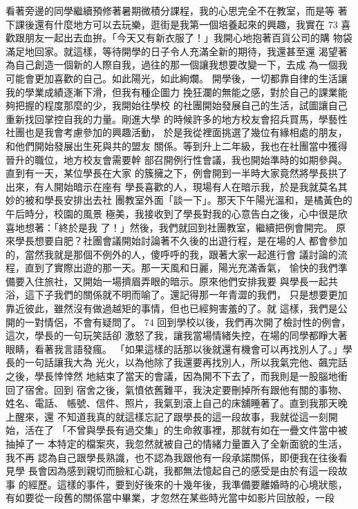看著旁邊的同學繼續預修著暑期微積分課程，我的心思完全不在教室，而是等
著下課後還有什麼地方可以去玩樂，逛街是我第一個培養起來的興趣，我實在
73 
喜歡跟朋友一起出去血拚。「今天又有新衣服了！」我開心地抱著百貨公司的購
物袋滿足地回家。就這樣，等待開學的日子令人充滿全新的期待，我還甚至還
渴望著為自己創造一個新的人際自我，過往的那一個讓我想要改變一下，去成
為一個我可能會更加喜歡的自己。如此陽光，如此絢爛。 
開學後，一切都靠自律的生活讓我的學業成績逐漸下滑，但我有種企圖力
挽狂瀾的無能之感，對於自己的課業能夠把握的程度那麼的少，我開始往學校
的社團開始發展自己的生活，試圖讓自己重新找回掌控自我的力量。剛進大學
的時候許多的地方校友會招兵買馬，學藝性社團也是我會考慮參加的興趣活動，
於是我從裡面挑選了幾位有緣相處的朋友，和他們開始發展出生死與共的盟友
關係。等到升上二年級，我也在社團當中獲得晉升的職位，地方校友會需要幹
部召開例行性會議，我也開始準時的如期參與。直到有一天，某位學長在大家
的簇擁之下，例會開到一半時大家竟然將學長拱了出來，有人開始暗示在座有
學長喜歡的人，現場有人在暗示我，於是我就莫名其妙的被和學長安排出去社
團教室外面「談一下」。那天下午陽光溫和，是橘黃色的午后時分，校園的風景
極美，我接收到了學長對我的心意告白之後，心中很是欣喜地想著：「終於是我
了！」然後，我們就回到社團教室，繼續把例會開完。 
原來學長想要自肥？社團會議開始討論著不久後的出遊行程，是在場的人
都會參加的，當然我就是那個不例外的人，傻呼呼的我，跟著大家一起進行會
議討論的流程，直到了實際出遊的那一天。那一天風和日麗，陽光充滿香氣，
愉快的我們準備要入住旅社，又開始一場擠眉弄眼的暗示。原來他們安排我要
與學長一起共浴，這下子我們的關係就不明而喻了。還記得那一年青澀的我們，
只是想要更加靠近彼此，雖然沒有做過越矩的事情，但也已經夠害羞的了。就
這樣，我們是公開的一對情侶，不會有疑問了。 
74 
回到學校以後，我們再次開了檢討性的例會，這次，學長的一句玩笑話卻
激怒了我，讓我當場情緒失控，在場的同學都睜大著眼睛，看著我言語發瘋。
「如果這樣的話那以後就還有機會可以再找別人了。」學長的一句話讓我大為
光火，以為他除了我還要再找別人，所以我氣完他、飆完話之後，學長悻悻然
地結束了當天的會議，因為開不下去了，而我則是一股腦地衝回了宿舍。回到
宿舍之後，氣憤依舊難平，我決定要刪掉所有跟他有關的事物、姓名、電話、
帳號、信件、照片，我氣到滾上自己的床舖睡著了。直到我那天晚上醒來，還
不知道我真的就這樣忘記了跟學長的這一段故事，我就從這一刻開始，活在了
「不曾與學長有過交集」的生命敘事裡，那就有如在一疊文件當中被抽掉了一
本特定的檔案夾，我忽然就被自己的情緒力量置入了全新面貌的生活，我不再
認為自己跟學長熟識，也不認為我跟他有一段承諾關係，即便我在往後看見學
長會因為感到親切而臉紅心跳，我都無法憶起自己的感受是由於有這一段故事
的經歷。這樣的事件，要到好後來的十幾年後，我準備要離婚時的心境狀態，
有如要從一段舊的關係當中畢業，才忽然在某些時光當中如影片回放般，一段

